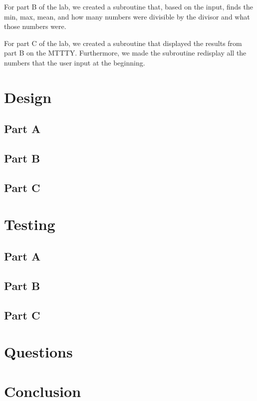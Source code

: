 \documentclass[10pt, letterpaper, titlepage]{article} %
\begin{document}
\begin{multicols*}{2}
For part B of the lab, we created a subroutine that, based on the input, finds the min, max, mean, and how many numbers were divisible by the divisor and what those numbers were.

For part C of the lab, we created a subroutine that displayed the results from part B on the MTTTY. Furthermore, we made the subroutine redisplay all the numbers that the user input at the beginning. 

\section{Design}
\subsection{Part A}


\subsection{Part B}


\subsection{Part C}


\section{Testing}
\subsection{Part A}


\subsection{Part B}


\subsection{Part C}


\section{Questions}


\section{Conclusion}



\end{multicols*}
\end{document}
